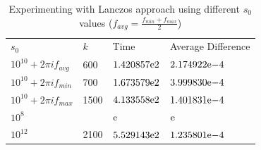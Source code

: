 \begin{table}[!tbh]
 \centering    
\begin{tabular}{ ||p{3.0cm}|p{1.5cm}| p{4cm}| p{4cm}||}
\hline
 $s_{0}$  & $k$ & Time & Average Difference \\ \hhline{|=|=|=|=|} 
 $10^{10} + 2 \pi i f_{avg}$ & 600 & ${1.420857}\mathrm{e}{2}$ & ${2.174922}\mathrm{e}{-4}$ \\
 $10^{10} + 2 \pi i f_{min}$ & 700 & ${1.673579}\mathrm{e}{2}$ & ${3.999830}\mathrm{e}{-4}$ \\
 $10^{10} + 2 \pi i f_{max}$ & 1500& ${4.133558}\mathrm{e}{2}$& ${1.401831}\mathrm{e}{-4}$\\
 $10^{8} $                   &     & ${}\mathrm{e}{}$& ${}\mathrm{e}{}$ \\
 $10^{12}$                   & 2100 & ${5.529143}\mathrm{e}{2}$& ${1.235801}\mathrm{e}{-4}$\\  
\hline
\end{tabular} 
\caption{Experimenting with Lanczos approach using different $s_{0}$ values ($f_{avg} = \frac{f_{min}+f_{max}}{2}$) }
   \label{tab:s02}
\end{table}